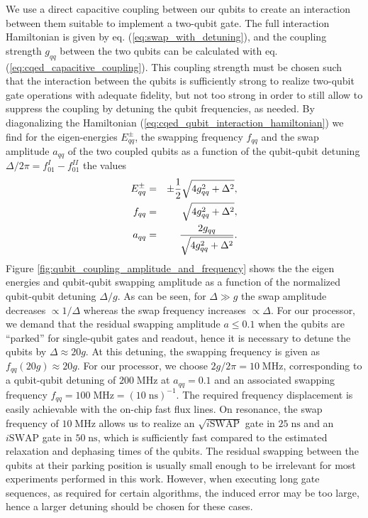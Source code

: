 We use a direct capacitive coupling between our qubits to create an interaction between them suitable to implement a two-qubit gate. The full interaction Hamiltonian is given by eq. (\ref{eq:swap_with_detuning}), and the coupling strength $g_{qq}$ between the two qubits can be calculated with eq. (\ref{eq:cqed_capacitive_coupling}). This coupling strength must be chosen such that the interaction between the qubits is sufficiently strong to realize two-qubit gate operations with adequate fidelity, but not too strong in order to still allow to suppress the coupling by detuning the qubit frequencies, as needed. By diagonalizing the Hamiltonian (\ref{eq:cqed_qubit_interaction_hamiltonian}) we find for the eigen-energies $E_{qq}^\pm$, the swapping frequency $f_{qq}$ and the swap amplitude $a_{qq}$ of the two coupled qubits as a function of the qubit-qubit detuning $\Delta/2\pi=f_{01}^I-f_{01}^{II}$ the values
%
\begin{eqnarray}
E_{qq}^\pm & = & \pm\frac{1}{2}\sqrt{4g_{qq}^2+\Delta^2}, \notag \\
f_{qq}     & = & \sqrt{4g_{qq}^2+\Delta^2}, \notag \\
a_{qq}     & = & \frac{2g_{qq}}{\sqrt{4g_{qq}^2+\Delta^2}}. \label{eq:qubit_coupling_amplitude_and_frequency}
\end{eqnarray}
%
Figure \ref{fig:qubit_coupling_amplitude_and_frequency} shows the the eigen energies and qubit-qubit swapping amplitude as a function of the normalized qubit-qubit detuning $\Delta/g$. As can be seen, for $\Delta \gg g$ the swap amplitude decreases $\propto 1/\Delta$ whereas the swap frequency increases $\propto \Delta$. For our processor, we demand that the residual swapping amplitude $a\le 0.1$ when the qubits are ``parked'' for single-qubit gates and readout, hence it is necessary to detune the qubits by $\Delta \approx 20 g$. At this detuning, the swapping frequency is given as $f_{qq}(20 g)\approx 20 g$. For our processor, we choose $2g/2\pi = 10\;\mathrm{MHz}$, corresponding to a qubit-qubit detuning of $200\;\mathrm{MHz}$ at $a_{qq}=0.1$ and an associated swapping frequency $f_{qq}=100\;\mathrm{MHz}=(10\;\mathrm{ns})^{-1}$. The required frequency displacement is easily achievable with the on-chip fast flux lines. On resonance, the swap frequency of $10\;\mathrm{MHz}$ allows us to realize an $\sqrt{i\mathrm{SWAP}}$ gate in $25\;\mathrm{ns}$ and an $i\mathrm{SWAP}$ gate in $50\;\mathrm{ns}$, which is sufficiently fast compared to the estimated relaxation and dephasing times of the qubits. The residual swapping between the qubits at their parking position is usually small enough to be irrelevant for most experiments performed in this work. However, when executing long gate sequences, as required for certain algorithms, the induced error may be too large, hence a larger detuning should be chosen for these cases.

